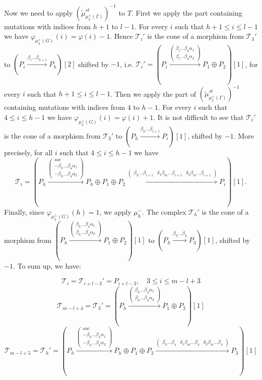 \documentclass[12pt]{amsart}
\theoremstyle{plain}
\theoremstyle{remark}
\theoremstyle{definition}
\begin{document}
\begin{enumerate}
\begin{enumerate}
Now we need to apply $(\widetilde{\mu}^{st}_{\mu^+_3(\Gamma)})^{-1}$ to $T$. First we apply the part containing mutations with indices from $h+1$ to $l-1$. For every $i$ such that $h+1 \leq i \leq l-1$ we have $\varphi_{\mu_3^+(G)}(i) = \varphi(i)-1$. Hence $\mathcal{T}_i'$ is the cone of a morphism from $\mathcal{T}_3'$ to $(P_i \xrightarrow{\beta_i \dots \beta_{h+1}} P_h)[2]$ shifted by $-1$, i.e. ${\mathcal{T}_i' = (P_i \xrightarrow{\begin{pmatrix} \beta_i \dots \beta_4 \alpha_1 \\ \beta_i \dots \beta_4 \alpha_2 \end{pmatrix}} P_1\oplus P_2)[1]}$, for every $i$ such that $h+1 \leq i \leq l-1$. Then we apply the part of $(\widetilde{\mu}^{st}_{\mu^+_3(\Gamma)})^{-1}$ containing mutations with indices from $4$ to $h-1$. For every $i$ such that $4 \leq i \leq h-1$ we have $\varphi_{\mu_3^+(G)}(i) = \varphi(i)+1$. It is not difficult to see that $\mathcal{T}_i'$ is the cone of a morphism from $\mathcal{T}_3'$ to $(P_h \xrightarrow{\beta_h \dots \beta_{i+1}} P_i)[1]$, shifted by $-1$. More precisely, for all $i$ such that $ 4 \leq i \leq h-1$ we have $${\mathcal{T}_i = (P_h \xrightarrow{\begin{pmatrix} soc \\ -\beta_h \dots \beta_4 \alpha_1 \\ -\beta_h \dots \beta_4 \alpha_2 \end{pmatrix}} P_h \oplus P_1 \oplus P_{2} \xrightarrow{ \begin{pmatrix} \beta_h \dots \beta_{i+1} & \delta_1 \beta_m \dots \beta_{i+1} & \delta_2 \beta_m \dots \beta_{i+1}  \end{pmatrix}} P_i)[1]}.$$ Finally, since $\varphi_{\mu_3^+(G)}(h) = 1$, we apply $\mu_h^-$. The complex $\mathcal{T}_h'$ is the cone of a morphism from $(P_h \xrightarrow{\begin{pmatrix} \beta_h \dots \beta_4 \alpha_1 \\ \beta_h \dots \beta_4 \alpha_2 \end{pmatrix}} P_1 \oplus P_2)[1]$ to $(P_h \xrightarrow{\beta_h \dots \beta_4} P_3)[1]$, shifted by $-1$. 
To sum up, we have: 

$$\mathcal{T}_{i} = \mathcal{T}_{i+l-3}' = P_{i+l-3}, \quad 3 \leq i \leq m-l+3 $$
$$\mathcal{T}_{m-l+4} = \mathcal{T}_3'  = (P_h \xrightarrow{\begin{pmatrix} \beta_h \dots \beta_4 \alpha_1 \\ \beta_h \dots \beta_4 \alpha_2 \end{pmatrix}} P_1\oplus P_{2})[1]$$
$$\mathcal{T}_{m-l+5} = \mathcal{T}_h' = (P_h \xrightarrow{\begin{pmatrix} soc \\ -\beta_h\dots\beta_4\alpha_1 \\ -\beta_h \dots \beta_4 \alpha_2 \end{pmatrix}}P_h \oplus P_1 \oplus P_2 \xrightarrow{\begin{pmatrix} \beta_h \dots \beta_4 & \delta_1 \beta_m \dots \beta_4 & \delta_2\beta_m \dots \beta_4 \end{pmatrix}} P_3)[1]$$


\end{enumerate}
\end{enumerate}
\end{document}
